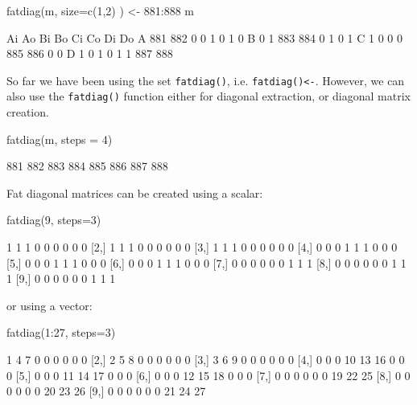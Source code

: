 \documentclass[article]{jss}
\begin{document}
\begin{CodeChunk}
\begin{CodeInput}
fatdiag(m, size=c(1,2) ) <- 881:888
m
\end{CodeInput}
\begin{CodeOutput}
   Ai  Ao  Bi  Bo  Ci  Co  Di  Do
A 881 882   0   0   1   0   1   0
B   0   1 883 884   0   1   0   1
C   1   0   0   0 885 886   0   0
D   1   0   1   0   1   1 887 888
\end{CodeOutput}
\end{CodeChunk}

So far we have been using the set \texttt{fatdiag()}, i.e.
\texttt{fatdiag()\textless{}-}. However, we can also use the
\texttt{fatdiag()} function either for diagonal extraction, or diagonal
matrix creation.

\begin{CodeChunk}
\begin{CodeInput}
fatdiag(m, steps = 4)
\end{CodeInput}
\begin{CodeOutput}
[1] 881 882 883 884 885 886 887 888
\end{CodeOutput}
\end{CodeChunk}

Fat diagonal matrices can be created using a scalar:

\begin{CodeChunk}
\begin{CodeInput}
fatdiag(9, steps=3)
\end{CodeInput}
\begin{CodeOutput}
      [,1] [,2] [,3] [,4] [,5] [,6] [,7] [,8] [,9]
 [1,]    1    1    1    0    0    0    0    0    0
 [2,]    1    1    1    0    0    0    0    0    0
 [3,]    1    1    1    0    0    0    0    0    0
 [4,]    0    0    0    1    1    1    0    0    0
 [5,]    0    0    0    1    1    1    0    0    0
 [6,]    0    0    0    1    1    1    0    0    0
 [7,]    0    0    0    0    0    0    1    1    1
 [8,]    0    0    0    0    0    0    1    1    1
 [9,]    0    0    0    0    0    0    1    1    1
\end{CodeOutput}
\end{CodeChunk}

or using a vector:

\begin{CodeChunk}
\begin{CodeInput}
fatdiag(1:27, steps=3)
\end{CodeInput}
\begin{CodeOutput}
      [,1] [,2] [,3] [,4] [,5] [,6] [,7] [,8] [,9]
 [1,]    1    4    7    0    0    0    0    0    0
 [2,]    2    5    8    0    0    0    0    0    0
 [3,]    3    6    9    0    0    0    0    0    0
 [4,]    0    0    0   10   13   16    0    0    0
 [5,]    0    0    0   11   14   17    0    0    0
 [6,]    0    0    0   12   15   18    0    0    0
 [7,]    0    0    0    0    0    0   19   22   25
 [8,]    0    0    0    0    0    0   20   23   26
 [9,]    0    0    0    0    0    0   21   24   27
\end{CodeOutput}
\end{CodeChunk}
\end{document}
